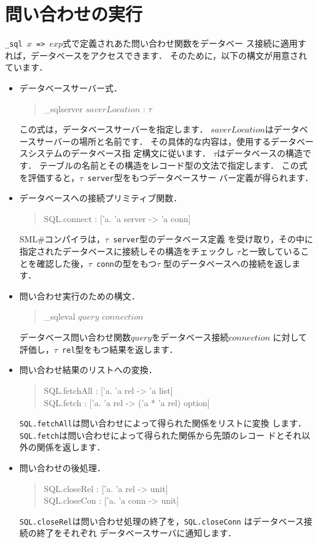 \documentclass{jbook}
\newcommand{\smlsharp}{SML\#}
\newenvironment{program}{\begin{tt}\begin{quote}}{\end{quote}\end{tt}}
\begin{document}
\section{問い合わせの実行}
\label{sec:tutorialExecutingSQL}

	{\tt \_sql $x$ => $exp$}式で定義されあた問い合わせ関数をデータベー
ス接続に適用すれば，データベースをアクセスできます．
	そのために，以下の構文が用意されています．
\begin{itemize}
\item データベースサーバー式．
\begin{program}
\_sqlserver $saverLocation$ : $\tau$
\end{program}
	この式は，データベースサーバーを指定します．
	$saverLocation$はデータベースサーバーの場所と名前です．
	その具体的な内容は，使用するデータベースシステムのデータベース指
定構文に従います．
	$\tau$はデータベースの構造です．
	テーブルの名前とその構造をレコード型の文法で指定します．
	この式を評価すると，{\tt $\tau$ server}型をもつデータベースサー
バー定義が得られます．
\item データベースへの接続プリミティブ関数．
\begin{program}
SQL.connect : ['a. 'a server -> 'a conn]
\end{program}
	\smlsharp{}コンパイラは，{\tt $\tau$ server}型のデータベース定義
を受け取り，その中に指定されたデータベースに接続しその構造をチェックし
$\tau$と一致していることを確認した後，{\tt $\tau$ conn}の型をもつ$\tau$
型のデータベースへの接続を返します．
	
\item 問い合わせ実行のための構文．
\begin{program}
\_sqleval $query$ $connection$
\end{program}
	データベース問い合わせ関数$query$をデータベース接続$connection$
に対して評価し，{\tt $\tau$ rel}型をもつ結果を返します．

\item 問い合わせ結果のリストへの変換．
\begin{program}
SQL.fetchAll : ['a. 'a rel -> 'a list]\\
SQL.fetch : ['a. 'a rel -> ('a * 'a rel) option]
\end{program}
	{\tt SQL.fetchAll}は問い合わせによって得られた関係をリストに変換
します．
	{\tt SQL.fetch}は問い合わせによって得られた関係から先頭のレコー
ドとそれ以外の関係を返します．
\item 問い合わせの後処理．
\begin{program}
SQL.closeRel : ['a. 'a rel -> unit]\\
SQL.closeCon : ['a. 'a conn -> unit]
\end{program}
	{\tt SQL.closeRel}は問い合わせ処理の終了を，{\tt SQL.closeConn}
はデータベース接続の終了をそれぞれ
データベースサーバに通知します．

\end{itemize}
		
\end{document}
